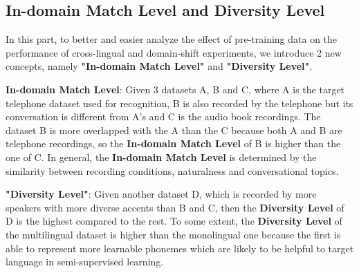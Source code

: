 \subsection{In-domain Match Level and Diversity Level}

In this part, to better and easier analyze the effect of pre-training data on the performance of cross-lingual and domain-shift experiments, we introduce 2 new concepts, namely \textbf{"In-domain Match Level"} and \textbf{"Diversity Level"}. 

\textbf{In-domain Match Level}: Given 3 datasets A, B and C, where A is the target telephone dataset used for recognition, B is also recorded by the telephone but its conversation is different from A's and C is the audio book recordings. 
The dataset B is more overlapped with the A than the C because both A and B are telephone recordings, so the \textbf{In-domain Match Level} of B is higher than the one of C. 
In general, the \textbf{In-domain Match Level} is determined by the similarity between recording conditions, naturalness and conversational topics.

\textbf{"Diversity Level"}: Given another dataset D, which is recorded by more speakers with more diverse accents than B and C, then the \textbf{Diversity Level} of D is the highest compared to the rest. 
To some extent, the \textbf{Diversity Level} of the multilingual dataset is higher than the monolingual one because the first is able to represent more learnable phonemes which are likely to be helpful to target language in semi-supervised learning.
